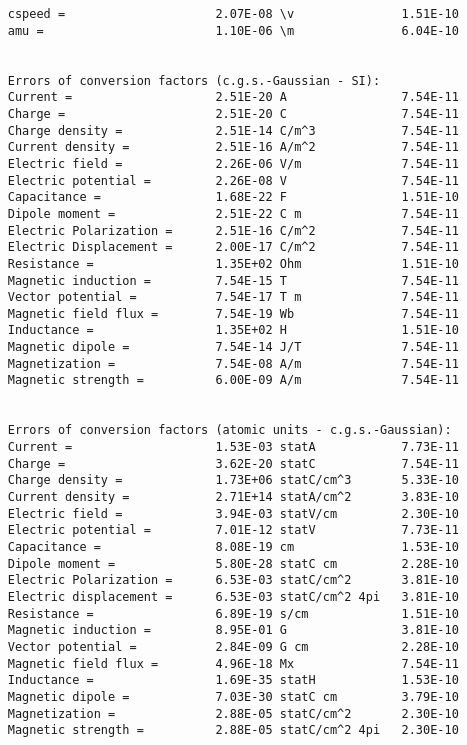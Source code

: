 \documentclass[12pt,a4paper]{article}
\begin{document}
\begin{verbatim}
     cspeed =                     2.07E-08 \v               1.51E-10
     amu =                        1.10E-06 \m               6.04E-10


     Errors of conversion factors (c.g.s.-Gaussian - SI):
     Current =                    2.51E-20 A                7.54E-11
     Charge =                     2.51E-20 C                7.54E-11
     Charge density =             2.51E-14 C/m^3            7.54E-11
     Current density =            2.51E-16 A/m^2            7.54E-11
     Electric field =             2.26E-06 V/m              7.54E-11
     Electric potential =         2.26E-08 V                7.54E-11
     Capacitance =                1.68E-22 F                1.51E-10
     Dipole moment =              2.51E-22 C m              7.54E-11
     Electric Polarization =      2.51E-16 C/m^2            7.54E-11
     Electric Displacement =      2.00E-17 C/m^2            7.54E-11
     Resistance =                 1.35E+02 Ohm              1.51E-10
     Magnetic induction =         7.54E-15 T                7.54E-11
     Vector potential =           7.54E-17 T m              7.54E-11
     Magnetic field flux =        7.54E-19 Wb               7.54E-11
     Inductance =                 1.35E+02 H                1.51E-10
     Magnetic dipole =            7.54E-14 J/T              7.54E-11
     Magnetization =              7.54E-08 A/m              7.54E-11
     Magnetic strength =          6.00E-09 A/m              7.54E-11


     Errors of conversion factors (atomic units - c.g.s.-Gaussian):
     Current =                    1.53E-03 statA            7.73E-11
     Charge =                     3.62E-20 statC            7.54E-11
     Charge density =             1.73E+06 statC/cm^3       5.33E-10
     Current density =            2.71E+14 statA/cm^2       3.83E-10
     Electric field =             3.94E-03 statV/cm         2.30E-10
     Electric potential =         7.01E-12 statV            7.73E-11
     Capacitance =                8.08E-19 cm               1.53E-10
     Dipole moment =              5.80E-28 statC cm         2.28E-10
     Electric Polarization =      6.53E-03 statC/cm^2       3.81E-10
     Electric displacement =      6.53E-03 statC/cm^2 4pi   3.81E-10
     Resistance =                 6.89E-19 s/cm             1.51E-10
     Magnetic induction =         8.95E-01 G                3.81E-10
     Vector potential =           2.84E-09 G cm             2.28E-10
     Magnetic field flux =        4.96E-18 Mx               7.54E-11
     Inductance =                 1.69E-35 statH            1.53E-10
     Magnetic dipole =            7.03E-30 statC cm         3.79E-10
     Magnetization =              2.88E-05 statC/cm^2       2.30E-10
     Magnetic strength =          2.88E-05 statC/cm^2 4pi   2.30E-10


\end{verbatim}
\end{document}
